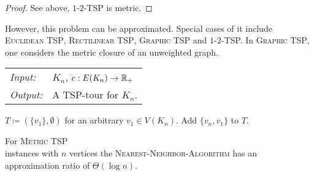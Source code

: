 \documentclass[../skript.tex]{subfiles}
\begin{document}
\begin{proof}
See above, $1$-$2$-TSP is metric.
\end{proof}
However, this problem can be approximated. Special cases of it include \textsc{Euclidean TSP}, \textsc{Rectilinear TSP}, \textsc{Graphic TSP} and $1$-$2$-TSP. In \textsc{Graphic TSP}, one considers the metric closure of an unweighted graph.
\begin{algorithmbox}
\begin{tabular}{@{}ll}
\textit{Input:} & $K_n$, $c : E(K_n) \to \mathbb{R}_+$\\
\textit{Output:} & A TSP-tour for $K_n$.
\end{tabular}
\end{algorithmbox}
\vspace{-7pt}
\begin{algorithm}[H]
$T \coloneqq (\{ v_1 \}, \emptyset)$ for an arbitrary $v_1 \in V(K_n)$.\;
Add $\{ v_n, v_1 \}$ to $T$.\;
\end{algorithm}
\vspace{-7pt}
\EndAlgorithmLine
\begin{theorem} %
For \textsc{Metric TSP}\\instances with $n$ vertices the \textsc{Nearest-Neighbor-Algorithm} has an approximation ratio of $\Theta(\log n)$.
\end{theorem}
\end{document}
